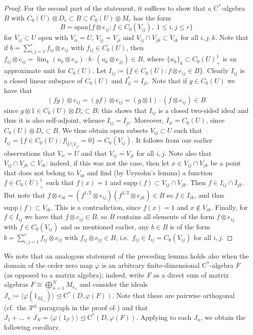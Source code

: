\documentclass[11pt,a4paper]{amsart}
\theoremstyle{definition}
\numberwithin{equation}{section}
\def\supp{\mathrm{supp}}
\begin{document}
\begin{proof}

For the second part of the statement, it suffices to show that a $\mathrm{C}^\ast$-algebra $B$ with $C_0(U)\otimes D_r\subset B\subset C_0(U)\otimes M_r$ has the form
\[
B=\mathrm{span}\{f\otimes e_{ij}: f\in C_0(V_{ij}),\; 1\le i,j\le r\}
\]
for $V_{ij}\subset U$ open with $V_{ii}=U$, $V_{ij}=V_{ji}$ and $V_{ij}\cap V_{jk}\subset V_{ik}$ for all $i,j,k$. Note that if $b=\sum_{i,j=1}^rf_{ij}\otimes e_{ij}$ with $f_{ij}\in C_0(U)$, then $f_{ij}\otimes e_{ij}=\lim_k(u_k\otimes e_{ii})\cdot b\cdot(u_k\otimes e_{jj})\in B$, where $\{u_k\}_k\subset C_0(U)_+^1$ is an approximate unit for $C_0(U)$. Let $I_{ij}\coloneqq \{f\in C_0(U): f\otimes e_{ij}\in B\}$.  Clearly $I_{ij}$ is a closed linear subspace of $C_0(U)$ and $I_{ij}^*=I_{ji}$. Note that if $g\in C_0(U)$ we have that
\[
(fg)\otimes e_{ij}=(gf)\otimes e_{ij}=(g\otimes 1)\cdot(f\otimes e_{ij})\in B
\]
since $g\otimes 1\in C_0(U)\otimes D_r\subset B$; this shows that $I_{ij}$ is a closed two-sided ideal and thus it is also self-adjoint, whence $I_{ij}=I_{ji}$. Moreover, $I_{ii}=C_0(U)$, since $C_0(U)\otimes D_r\subset B$. We thus obtain open subsets $V_{ij}\subset U$ such that $I_{ij} = \{f\in C_0(U): f\vert_{U\setminus V_{ij}}=0\}=C_0(V_{ij})$. It follows from our earlier observations that $V_{ii}=U$ and that $V_{ij}=V_{ji}$ for all $i,j$.  Note also that $V_{ij}\cap V_{jk}\subset V_{ik}$: indeed, if this was not the case, then let $x\in V_{ij}\cap V_{jk}$ be a point that does not belong to $V_{ik}$ and find (by Urysohn's lemma) a function $f\in C_0(U)_+^1$ such that $f(x)=1$ and $\supp(f)\subset V_{ij}\cap V_{jk}$. Then $f\in I_{ij}\cap I_{jk}$. But note that $f\otimes e_{ik}=(f^{1/2}\otimes e_{ij})(f^{1/2}\otimes e_{jk})\in B$ so $f\in I_{ik}$, and thus $\supp(f)\subset V_{ik}$. This is a contradiction, since $f(x)=1$ and $x\not\in V_{ik}$. Finally, for $f\in I_{ij}$ we have that $f\otimes e_{ij}\in B$, so $B$ contains all elements of the form $f\otimes e_{ij}$ with $f\in C_0(V_{ij})$ and as mentioned earlier, any $b\in B$ is of the form $b=\sum_{i,j=1}^rf_{ij}\otimes e_{ij}$ with $f_{ij}\otimes e_{ij}\in B$, i.e.\ $f_{ij}\in I_{ij}=C_0(V_{ij})$ for all $i,j$.
\end{proof}


We note that an analogous statement of the preceding lemma holds also when the domain of the order zero map $\varphi$ is an arbitrary finite-dimensional $\mathrm{C}^\ast$-algebra $F$ (as opposed to a matrix algebra); indeed, write $F$ as a direct sum of matrix algebras $F\cong \bigoplus_{n=1}^NM_{r_n}$ and consider the ideals $J_n\coloneqq\langle\varphi(1_{M_{r_n}})\rangle \trianglelefteq\mathrm{C}^\ast(D,\varphi(F))$. Note that these are pairwise orthogonal (cf.\ the 3$^\mathrm{rd}$ paragraph in the proof of \cite[Proposition~4.3]{KopWin24}) and that $J_1+\dots +J_N=\langle\varphi(1_F)\rangle\trianglelefteq\mathrm{C}^\ast(D,\varphi(F))$. Applying  to each $J_n$, we obtain the following corollary.
\end{document}
